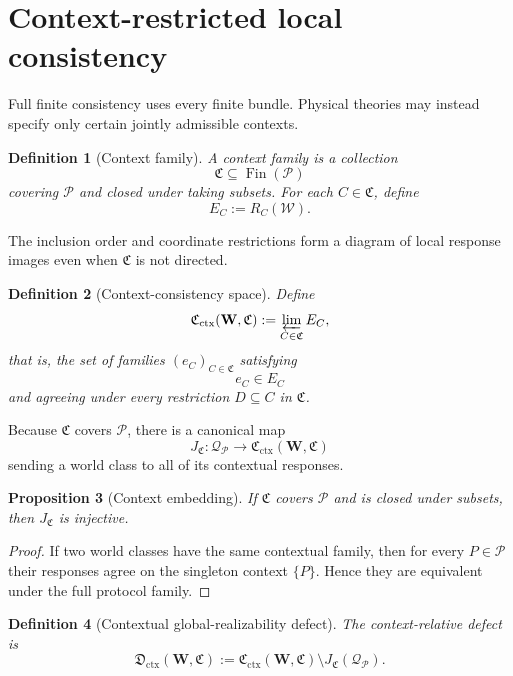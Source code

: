 \documentclass[11pt]{article}
\newtheorem{definition}{Definition}[section]
\newtheorem{proposition}[definition]{Proposition}
\newcommand{\W}{\mathcal W}
\newcommand{\Pcal}{\mathcal P}
\newcommand{\Fin}{\operatorname{Fin}}
\begin{document}
\section{Context-restricted local consistency}

Full finite consistency uses every finite bundle. Physical theories may instead
specify only certain jointly admissible contexts.

\begin{definition}[Context family]
A \emph{context family} is a collection
\[
\mathfrak C\subseteq\Fin(\Pcal)
\]
covering $\Pcal$ and closed under taking subsets. For each
$C\in\mathfrak C$, define
\[
E_C:=R_C(\W).
\]
\end{definition}

The inclusion order and coordinate restrictions form a diagram of local
response images even when $\mathfrak C$ is not directed.

\begin{definition}[Context-consistency space]
Define
\[
\mathfrak C_{\mathrm{ctx}}(\mathbf W,\mathfrak C)
:=
\varprojlim_{C\in\mathfrak C}E_C,
\]
that is, the set of families $(e_C)_{C\in\mathfrak C}$ satisfying
\[
e_C\in E_C
\]
and agreeing under every restriction $D\subseteq C$ in $\mathfrak C$.
\end{definition}

Because $\mathfrak C$ covers $\Pcal$, there is a canonical map
\[
J_{\mathfrak C}:\mathcal Q_{\Pcal}
\longrightarrow
\mathfrak C_{\mathrm{ctx}}(\mathbf W,\mathfrak C)
\]
sending a world class to all of its contextual responses.

\begin{proposition}[Context embedding]
If $\mathfrak C$ covers $\Pcal$ and is closed under subsets, then
$J_{\mathfrak C}$ is injective.
\end{proposition}

\begin{proof}
If two world classes have the same contextual family, then for every
$P\in\Pcal$ their responses agree on the singleton context $\{P\}$.
Hence they are equivalent under the full protocol family.
\end{proof}

\begin{definition}[Contextual global-realizability defect]
The context-relative defect is
\[
\mathfrak D_{\mathrm{ctx}}(\mathbf W,\mathfrak C)
:=
\mathfrak C_{\mathrm{ctx}}(\mathbf W,\mathfrak C)
\setminus
J_{\mathfrak C}(\mathcal Q_{\Pcal}).
\]
\end{definition}
\end{document}
